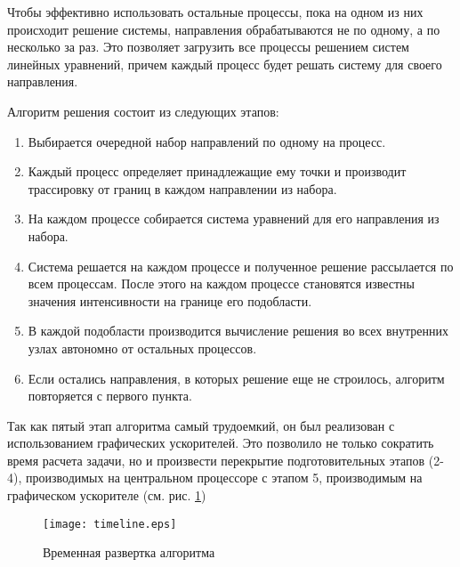 Чтобы эффективно использовать остальные процессы, пока на одном из них происходит решение системы, направления обрабатываются не по одному, а по несколько за раз. Это позволяет загрузить все процессы решением систем линейных уравнений, причем каждый процесс будет решать систему для своего направления.

Алгоритм решения состоит из следующих этапов:
\begin{enumerate}
\item Выбирается очередной набор направлений по одному на процесс.
\item Каждый процесс определяет принадлежащие ему точки и производит трассировку от границ в каждом направлении из набора.
\item На каждом процессе собирается система уравнений для его направления из набора.
\item Система решается на каждом процессе и полученное решение рассылается по всем процессам. После этого на каждом процессе становятся известны значения интенсивности на границе его подобласти.
\item В каждой подобласти производится вычисление решения во всех внутренних узлах автономно от остальных процессов.
\item Если остались направления, в которых решение еще не строилось, алгоритм повторяется с первого пункта.
\end{enumerate}

Так как пятый этап алгоритма самый трудоемкий, он был реализован с использованием графических ускорителей. Это позволило не только сократить время расчета задачи, но и произвести перекрытие подготовительных этапов (2-4), производимых на центральном процессоре с этапом 5, производимым на графическом ускорителе (см. рис. \ref{fig:timeline})
\begin{figure}[ht!]
\centering
\texttt{[image: timeline.eps]}
\caption{Временная развертка алгоритма}
\label{fig:timeline}
\end{figure}
